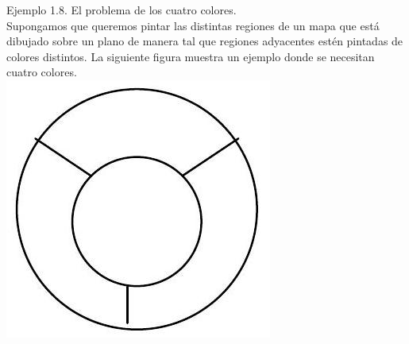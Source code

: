 \documentclass[10pt]{article}
\begin{document}
Ejemplo 1.8. El problema de los cuatro colores.\\
Supongamos que queremos pintar las distintas regiones de un mapa que está dibujado sobre un plano de manera tal que regiones adyacentes estén pintadas de colores distintos. La siguiente figura muestra un ejemplo donde se necesitan cuatro colores.\\
\includegraphics[max width=\textwidth, center]{2025_09_05_458e5b1ce89abceb5d44g-07}
\end{document}
